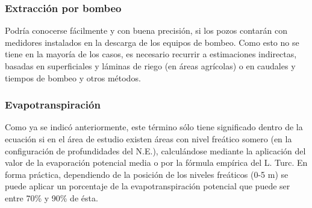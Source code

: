 \subsubsection{Extracción por bombeo}
Podría conocerse fácilmente y con buena precisión, si los pozos contarán con medidores instalados en la descarga de los equipos de bombeo. Como esto no se tiene en la mayoría de los casos, es necesario recurrir a estimaciones indirectas, basadas en superficiales y láminas de riego (en áreas agrícolas) o en caudales y tiempos de bombeo y otros métodos.

\subsubsection{Evapotranspiración}
Como ya se indicó anteriormente, este término sólo tiene significado dentro de la ecuación si en el área de estudio existen áreas con nivel freático somero (en la configuración de profundidades del N.E.), calculándose mediante la aplicación del valor de la evaporación potencial media o por la fórmula empírica del L. Turc. En forma práctica, dependiendo de la posición de los niveles freáticos (0-5 m) se puede aplicar un porcentaje de la evapotranspiración potencial que puede ser entre 70\% y 90\% de ésta.

